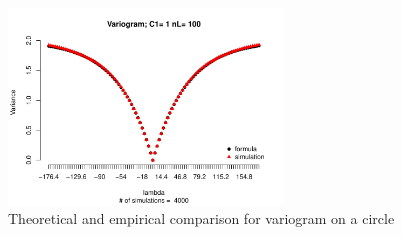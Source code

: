 \begin{figure}[H]
	\centering
	\includegraphics[width=0.65\textwidth]{graphs/variogram_plot_4000}
	\caption {Theoretical and empirical comparison for variogram on a circle}
\end{figure}


